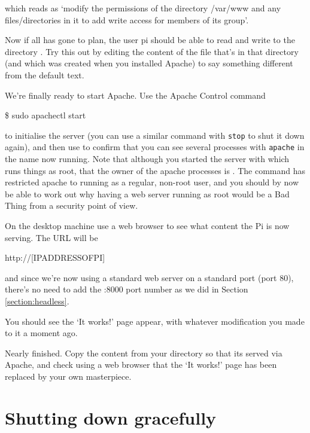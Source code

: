 which reads as `modify the permissions of the directory /var/www and any files/directories in it to add write access for members of its group'. 

Now if all has gone to plan, the user pi should be able to read and write to the directory . Try this out by editing the content of the  file that's in that directory (and which was created when you installed Apache) to say something different from the default text.

We're finally ready to start Apache. Use the Apache Control command

\begin{ttoutenv}
\$ sudo apachectl start
\end{ttoutenv}

to initialise the server (you can use a similar command with \texttt{stop} to shut it down again), and then use  to confirm that you can see several processes with \texttt{apache} in the name now running. Note that although you started the server with  which runs things as root, that the owner of the apache processes is . The  command has restricted apache to running as a regular, non-root user, and you should by now be able to work out why having a web server running as root would be a Bad Thing from a security point of view.

On the desktop machine use a web browser to see what content the Pi is now serving. The URL will be 

\begin{ttoutenv}
http://[IPADDRESSOFPI]
\end{ttoutenv}

and since we're now using a standard web server on a standard port (port 80), there's no need to add the :8000 port number as we did in Section \ref{section:headless}. 

You should see the `It works!' page appear, with whatever modification you made to it a moment ago.

Nearly finished. Copy the content from your  directory so that its served via Apache, and check using a web browser that the `It works!' page has been replaced by your own masterpiece.   

\section{Shutting down gracefully}


